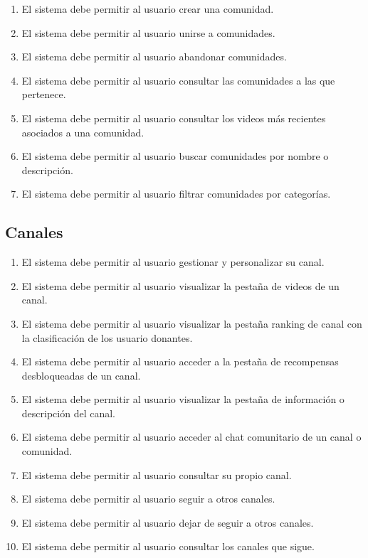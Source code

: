 \begin{enumerate}[label=\textbf{RF-COM \arabic*.}, leftmargin=*]
    \item El sistema debe permitir al usuario crear una comunidad.
    \item El sistema debe permitir al usuario unirse a comunidades.
    \item El sistema debe permitir al usuario abandonar comunidades.
    \item El sistema debe permitir al usuario consultar las comunidades a las que pertenece.
    \item El sistema debe permitir al usuario consultar los videos más recientes asociados a una comunidad.
    \item El sistema debe permitir al usuario buscar comunidades por nombre o descripción.
    \item El sistema debe permitir al usuario filtrar comunidades por categorías.
\end{enumerate}

\subsection{Canales}

\begin{enumerate}[label=\textbf{RF-CAN \arabic*.}, leftmargin=*]
    \item El sistema debe permitir al usuario gestionar y personalizar su canal.
    \item El sistema debe permitir al usuario visualizar la pestaña de videos de un canal.
    \item El sistema debe permitir al usuario visualizar la pestaña ranking de canal con la clasificación de los usuario donantes.
    \item El sistema debe permitir al usuario acceder a la pestaña de recompensas desbloqueadas de un canal.
    \item El sistema debe permitir al usuario visualizar la pestaña de información o descripción del canal.
    \item El sistema debe permitir al usuario acceder al chat comunitario de un canal o comunidad.
    \item El sistema debe permitir al usuario consultar su propio canal.
    \item El sistema debe permitir al usuario seguir a otros canales.
    \item El sistema debe permitir al usuario dejar de seguir a otros canales.
    \item El sistema debe permitir al usuario consultar los canales que sigue.
\end{enumerate}


